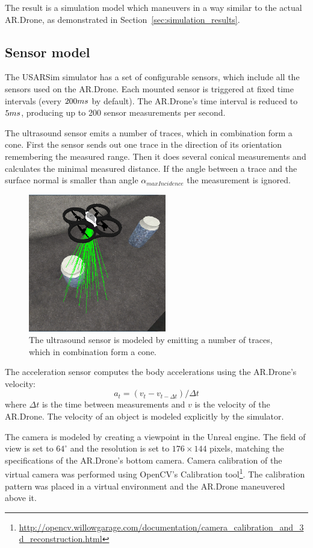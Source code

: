 The result is a simulation model which maneuvers in a way similar to the actual AR.Drone, as demonstrated in Section~\ref{sec:simulation_results}.


		\subsection{Sensor model}
The USARSim simulator has a set of configurable sensors, which include all the sensors used on the AR.Drone.
Each mounted sensor is triggered at fixed time intervals (every $200\small{ms}$ by default).
The AR.Drone's time interval is reduced to $5\small{ms}$, producing up to 200 sensor measurements per second.

The ultrasound sensor emits a number of traces, which in combination form a cone.
First the sensor sends out one trace in the direction of its orientation remembering the measured range.
Then it does several conical measurements and calculates the minimal measured distance.
If the angle between a trace and the surface normal is smaller than angle $\alpha_{maxIncidence}$ the measurement is ignored.

\begin{figure}[htb!]
\centering
\includegraphics[width=6cm]{images/usarsim_sonar_beams.png}
\caption{The ultrasound sensor is modeled by emitting a number of traces, which in combination form a cone.} 
\label{fig:3Dmodel}
\end{figure}


The acceleration sensor computes the body accelerations using the AR.Drone's velocity:
\begin{equation}
a_{t} = (v_{t} - v_{t-\Delta t}) / \Delta t
\end{equation}
where $\Delta t$ is the time between measurements and $v$ is the velocity of the AR.Drone. The velocity of an object is modeled explicitly by the simulator.

The camera is modeled by creating a viewpoint in the Unreal engine.
The field of view is set to $64^\circ$ and the resolution is set to $176 \times 144$ pixels, matching the specifications of the AR.Drone's bottom camera.
Camera calibration of the virtual camera was performed using OpenCV's Calibration tool\footnote{\url{http://opencv.willowgarage.com/documentation/camera_calibration_and_3d_reconstruction.html}}.
The calibration pattern was placed in a virtual environment and the AR.Drone maneuvered above it.

